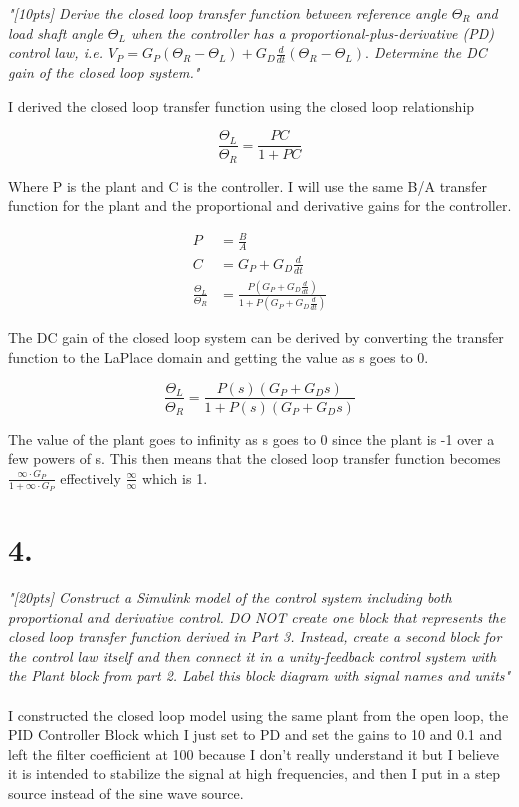 \documentclass{article}
\begin{document}
\textit{
    "[10pts] Derive the closed loop transfer function between reference angle
    $\Theta_R$ and load shaft angle $\Theta_L$ when the controller has a 
    proportional-plus-derivative (PD) control law, i.e.
    $V_P = G_P(\Theta_R - \Theta_L) + G_D\frac{d}{dt}(\Theta_R - \Theta_L).$
    Determine the DC gain of the closed loop system."
}

I derived the closed loop transfer function using the closed loop relationship

\[
\frac{\Theta_L}{\Theta_R}=\frac{PC}{1+PC}
\]

Where P is the plant and C is the controller.
I will use the same B/A transfer function for the plant and the proportional and derivative gains for the controller.

\begin{align*}
    P &= \frac{B}{A} \\
    C &= G_P+G_D\frac{d}{dt} \\
    \frac{\Theta_L}{\Theta_R}&=\frac{P(G_P+G_D\frac{d}{dt})}{1+P(G_P+G_D\frac{d}{dt})}
\end{align*}

The DC gain of the closed loop system can be derived by converting the transfer function to the LaPlace domain and getting the value as s goes to 0.

\[
\frac{\Theta_L}{\Theta_R}=\frac{P(s)(G_P+G_Ds)}{1+P(s)(G_P+G_Ds)}
\]

The value of the plant goes to infinity as s goes to 0 since the plant is -1 over a few powers of s.
This then means that the closed loop transfer function becomes $\frac{\infty \cdot G_P}{1 + \infty \cdot G_P}$ effectively $\frac{\infty}{\infty}$ which is 1.

\section*{4.}

\textit{
    "[20pts] Construct a Simulink model of the control system including both proportional and
    derivative control. DO NOT create one block that represents the closed loop transfer function
    derived in Part 3. Instead, create a second block for the control law itself and then connect it in a
    unity-feedback control system with the Plant block from part 2. Label this block diagram with
    signal names and units"
}
\\
\\
I constructed the closed loop model using the same plant from the open loop, the PID Controller Block which I just set to PD and set the gains to 10 and 0.1 and left the filter coefficient at 100 because I don't really understand it but I believe it is intended to stabilize the signal at high frequencies, and then I put in a step source instead of the sine wave source.
\end{document}
